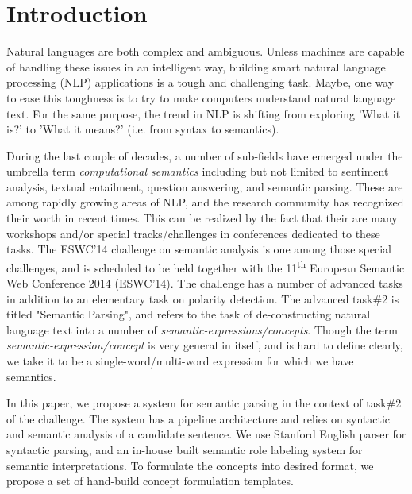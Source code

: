 \documentclass[runningheads,a4paper]{llncs}
\begin{document}
\section{Introduction}
Natural languages are both complex and ambiguous. Unless machines are capable of handling these issues in an intelligent way, building smart natural language processing (NLP) applications is a tough and challenging task. Maybe, one way to ease this toughness is to try to make computers understand natural language text. For the same purpose, the trend in NLP is shifting from exploring 'What it is?' to 'What it means?' (i.e. from syntax to semantics). 

During the last couple of decades, a number of sub-fields have emerged under the umbrella term \textit{computational semantics} including but not limited to sentiment analysis, textual entailment, question answering, and semantic parsing. These are among rapidly growing areas of NLP, and the research community has recognized their worth in recent times. This can be realized by the fact that their are many workshops and/or special tracks/challenges in conferences dedicated to these tasks. The ESWC'14 challenge on semantic analysis is one among those special challenges, and is scheduled to be held together with the 11\textsuperscript{th} European Semantic Web Conference 2014 (ESWC'14). The challenge has a number of advanced tasks in addition to an elementary task on polarity detection. The advanced task\#2 is titled "Semantic Parsing", and refers to the task of de-constructing natural language text into a number of \textit{semantic-expressions/concepts}. Though the term \textit{semantic-expression/concept} is very general in itself, and is hard to define clearly, we take it to be a single-word/multi-word expression for which we have semantics. %


In this paper, we propose a system for semantic parsing in the context of task\#2 of the challenge. The system has a pipeline architecture and relies on syntactic and semantic analysis of a candidate sentence. We use Stanford English parser \cite{stanford} for syntactic parsing, and an in-house built semantic role labeling system for semantic interpretations. To formulate the concepts into desired format, we propose a set of hand-build concept formulation templates. 
                
\end{document}
